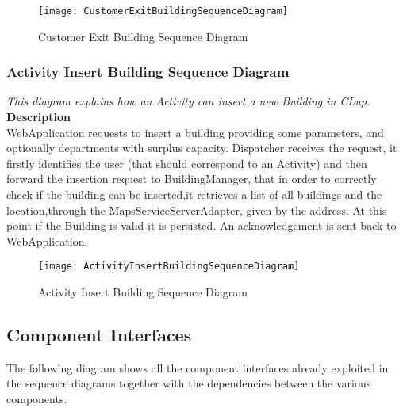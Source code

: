 \begin{figure}[H]
 \centering
 \texttt{[image: CustomerExitBuildingSequenceDiagram]}
 \caption{ Customer Exit Building Sequence Diagram }
 \end{figure}

\newpage
\subsubsection{Activity Insert Building Sequence Diagram}
\textit{This diagram explains how an Activity can insert a new Building in CLup.\\}
\textbf{Description\\}
WebApplication requests to insert a building providing some parameters, and optionally departments with surplus capacity. Dispatcher receives the request, it firstly identifies the user (that should correspond to an Activity) and then forward the insertion request to BuildingManager, that in order to correctly check if the building can be inserted,it retrieves a list of all buildings and the location,through the MapsServiceServerAdapter, given by the address. At this point if the Building is valid it is persisted. An acknowledgement is sent back to WebApplication.\\

\begin{figure}[H]
 \centering
 \texttt{[image: ActivityInsertBuildingSequenceDiagram]}
 \caption{ Activity Insert Building Sequence Diagram }
 \end{figure}

\newpage
\subsection{Component Interfaces}
The following diagram shows all the component interfaces already exploited in the sequence diagrams together with the dependencies between the various components. 
\newpage
